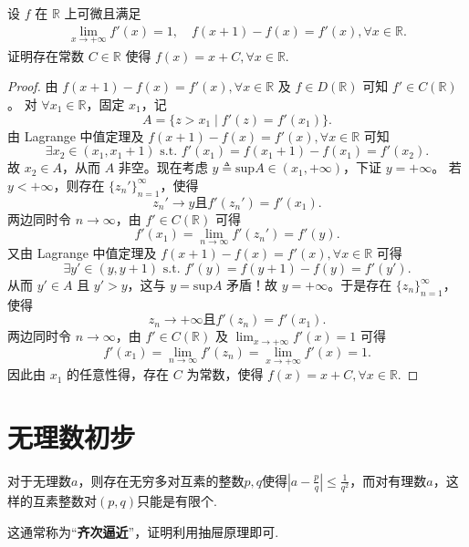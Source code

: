 \documentclass[../../main.tex]{subfiles}
\begin{document}
\begin{example}[$\,\,$时滞方程]\label{example:时滞方程}
设 $f$ 在 $\mathbb{R}$ 上可微且满足
\begin{align*}
\lim_{x \to +\infty} f'(x) = 1, \quad
f(x+1) - f(x) = f'(x), \forall x \in \mathbb{R}.
\end{align*}
证明存在常数 $C \in \mathbb{R}$ 使得 $f(x) = x + C, \forall x \in \mathbb{R}$.
\end{example}
\begin{proof}
由 \( f(x+1)-f(x)=f'(x),\forall x\in \mathbb{R} \) 及 \( f\in D(\mathbb{R}) \) 可知 \( f' \in C(\mathbb{R}) \)。
对 \(\forall x_1\in \mathbb{R} \)，固定 \( x_1 \)，记
\[ A=\{ z>x_1 \mid f'(z) = f'(x_1) \} .\]
由 Lagrange 中值定理及 \( f(x+1)-f(x)=f'(x),\forall x\in \mathbb{R} \) 可知
\[ \exists x_2\in (x_1,x_1+1) \,\,\mathrm{s}.\mathrm{t}.\,\, f'(x_1) = f(x_1+1) - f(x_1) = f'(x_2) .\]
故 \( x_2 \in A \)，从而 \( A \) 非空。现在考虑 \( y \triangleq \mathrm{sup}A \in (x_1,+\infty) \)，下证 \( y=+\infty \)。
若 \( y<+\infty \)，则存在 \(\{ z_{n}' \}_{n=1}^{\infty} \)，使得
\[ z_{n}' \rightarrow y \text{且} f'(z_{n}') = f'(x_1) .\]
两边同时令 \( n \rightarrow \infty \)，由 \( f' \in C(\mathbb{R}) \) 可得
\[ f'(x_1) = \lim_{n \rightarrow \infty} f'(z_{n}') = f'(y) .\]
又由 Lagrange 中值定理及 \( f(x+1)-f(x)=f'(x),\forall x\in \mathbb{R} \) 可得
\[ \exists y' \in (y,y+1) \,\,\mathrm{s}.\mathrm{t}.\,\, f'(y) = f(y+1) - f(y) = f'(y') .\]
从而 \( y' \in A \) 且 \( y' > y \)，这与 \( y=\mathrm{sup}A \) 矛盾！故 \( y=+\infty \)。于是存在 \(\{ z_n \}_{n=1}^{\infty} \)，使得
\[ z_n \rightarrow +\infty \text{且} f'(z_n) = f'(x_1) .\]
两边同时令 \( n \rightarrow \infty \)，由 \( f' \in C(\mathbb{R}) \) 及 \(\lim_{x \rightarrow +\infty} f'(x) = 1 \) 可得
\[ f'(x_1) = \lim_{n \rightarrow \infty} f'(z_n) = \lim_{x \rightarrow +\infty} f'(x) = 1 .\]
因此由 \( x_1 \) 的任意性得，存在 \( C \) 为常数，使得 \( f(x) = x+C,\forall x\in \mathbb{R} \).
\end{proof}






\chapter{无理数初步}

\begin{theorem}[狄利克雷定理]\label{theorem:狄利克雷定理}
对于无理数\(a\)，则存在无穷多对互素的整数\(p,q\)使得\(\left|a - \frac{p}{q}\right|\leq\frac{1}{q^2}\)，而对有理数\(a\)，这样的互素整数对\((p,q)\)只能是有限个.
\end{theorem}
\begin{note}
这通常称为“\textbf{齐次逼近}”，证明利用抽屉原理即可.
\end{note}
\end{document}
